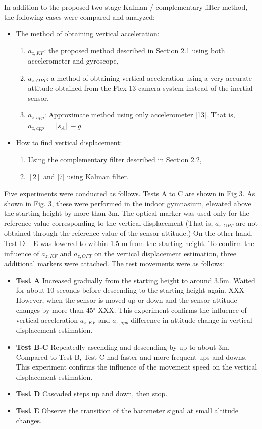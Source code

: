 \documentclass[10pt,journal,compsoc]{IEEEtran}
\begin{document}
In addition to the proposed two-stage Kalman / complementary filter method,
the following cases were compared and analyzed:

\begin{itemize}
\item The method of obtaining vertical acceleration: 
\begin{enumerate}
\item $a_{z,KF}$: the proposed method described in Section 2.1 using both accelerometer and gyroscope,
\item $a_{z,OPT}$: a method of obtaining vertical acceleration using a very accurate attitude obtained from the 
  Flex 13 camera system instead of the inertial sensor,
\item $a_{z,app}$: Approximate method using only accelerometer [13]. That is, $a_{z,app} = ||s_A|| - g$.
\end{enumerate}
\item How to find vertical displacement:
\begin{enumerate}
\item Using the complementary filter described in Section 2.2,
\item $[2]$ and [7] using Kalman filter.
\end{enumerate}
\end{itemize}

Five experiments were conducted as follows. Tests A to C are shown in Fig 3. As
shown in Fig. 3, these were performed in the indoor gymnasium, elevated above the
starting height by more than 3m. The optical marker was used only for the
reference value corresponding to the vertical displacement (That is, $a_{z,OPT}$
are not obtained through the reference value of the sensor attitude.) On the
other hand, Test D ~ E was lowered to within 1.5 m from the starting height.
To confirm the influence of $a_{z,KF}$ and $a_{z,OPT}$ on the vertical displacement
estimation, three additional markers were attached.  The test movements were as follows:
\begin{itemize}
    \item \textbf{Test A} Increased gradually from the starting height to around 3.5m.
         Waited for about 10 seconds before descending to the starting height again.
         XXX However, when the sensor is moved up or down and the sensor attitude changes by more than 
         45$^\circ$ XXX.  This experiment confirms the influence of vertical
         acceleration $a_{z,KF}$ and $a_{z,app}$ difference in attitude change in
         vertical displacement estimation.
    \item \textbf{Test B-C} Repeatedly ascending and descending by up to about 3m. Compared to Test B, 
        Test C had faster and more frequent ups and downs. This experiment
        confirms the influence of the movement speed on the vertical displacement
        estimation.
    \item \textbf{Test D} Cascaded steps up and down, then stop.
    \item \textbf{Test E} Observe the transition of the barometer signal at small altitude changes.
\end{itemize}
\end{document}
